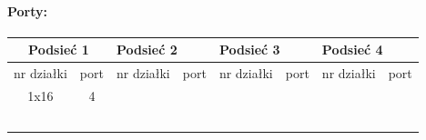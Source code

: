 	\paragraph{Porty:}
		\begin{center}
			\begin{table}[htbp]
					\begin{tabular}{|ll|ll|ll|ll|}
						\hline
						\multicolumn{2}{|c|}{\textbf{Podsieć 1}}                     & \multicolumn{2}{l|}{\textbf{Podsieć 2}}                     & \multicolumn{2}{l|}{\textbf{Podsieć 3}}                     & \multicolumn{2}{l|}{\textbf{Podsieć 4}}                     \\ \hline
						\multicolumn{1}{|c|}{nr działki} & \multicolumn{1}{c|}{port} & \multicolumn{1}{c|}{nr działki} & \multicolumn{1}{c|}{port} & \multicolumn{1}{c|}{nr działki} & \multicolumn{1}{c|}{port} & \multicolumn{1}{c|}{nr działki} & \multicolumn{1}{c|}{port} \\ \hline
						\multicolumn{1}{|c|}{1x16}       & \multicolumn{1}{c|}{4}    & \multicolumn{1}{l|}{}           &                           & \multicolumn{1}{l|}{}           &                           & \multicolumn{1}{l|}{}           &                           \\ \hline
						\multicolumn{1}{|l|}{}           &                           & \multicolumn{1}{l|}{}           &                           & \multicolumn{1}{l|}{}           &                           & \multicolumn{1}{l|}{}           &                           \\ \hline
						\multicolumn{1}{|l|}{}           &                           & \multicolumn{1}{l|}{}           &                           & \multicolumn{1}{l|}{}           &                           & \multicolumn{1}{l|}{}           &                           \\ \hline
						\multicolumn{1}{|l|}{}           &                           & \multicolumn{1}{l|}{}           &                           & \multicolumn{1}{l|}{}           &                           & \multicolumn{1}{l|}{}           &                           \\ \hline
						\multicolumn{1}{|l|}{}           &                           & \multicolumn{1}{l|}{}           &                           & \multicolumn{1}{l|}{}           &                           & \multicolumn{1}{l|}{}           &                           \\ \hline
						\multicolumn{1}{|l|}{}           &                           & \multicolumn{1}{l|}{}           &                           & \multicolumn{1}{l|}{}           &                           & \multicolumn{1}{l|}{}           &                           \\ \hline

\end{tabular}
\end{table}
\end{center}
